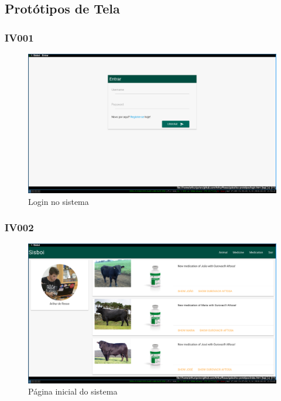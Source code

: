 \documentclass[12pt]{article}
\begin{document}
\begin{titlepage}
\newpage

\subsection{Protótipos de Tela}

\subsubsection{IV001}

\begin{figure}[!h]
\begin{center}
\caption{Login no sistema}
\includegraphics[width=13cm]{img/prototipos/login.png}


\end{center}
\end{figure}


\subsubsection{IV002}

\begin{figure}[!h]
\begin{center}
\caption{Página inicial do sistema}
\includegraphics[width=13cm]{img/prototipos/index.png}


\end{center}
\end{figure}
\end{titlepage}
\end{document}
